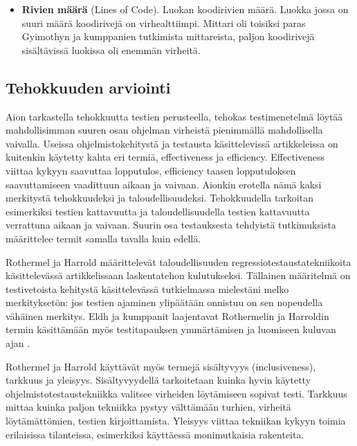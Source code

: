 \documentclass[finnish]{tktltiki2}
\theoremstyle{definition}
\theoremstyle{remark}
\begin{document}
\begin{itemize}
  \item \textbf{Rivien määrä} (Lines of Code). Luokan koodirivien määrä.  Luokka jossa on suuri määrä koodirivejä on virhealttiimpi. Mittari oli toisiksi paras Gyimothyn ja kumppanien tutkimista mittareista, paljon koodirivejä sisältävissä luokissa oli enemmän virheitä. \cite{Gyimothy05}


\end{itemize}





\subsection{Tehokkuuden arviointi}

Aion tarkastella tehokkuutta testien perusteella, tehokas testimenetelmä löytää mahdollisimman suuren osan ohjelman virheistä pienimmällä mahdollisella vaivalla. Useissa ohjelmistokehitystä ja testausta käsittelevissä artikkeleissa on kuitenkin käytetty kahta eri termiä, effectiveness ja efficiency.  Effectiveness viittaa kykyyn saavuttaa lopputulos, efficiency taasen lopputuloksen saavuttamiseen vaadittuun aikaan ja vaivaan. Aionkin erotella nämä kaksi merkitystä tehokkuudeksi ja taloudellisuudeksi. Tehokkuudella tarkoitan esimerkiksi testien kattavuutta ja taloudellisuudella testien kattavuutta verrattuna aikaan ja vaivaan. Suurin osa testauksesta tehdyistä tutkimuksista määrittelee termit samalla tavalla kuin edellä. \cite{Juristo06}

Rothermel ja Harrold määrittelevät taloudellisuuden regressiotestaustatekniikoita käsittelevässä artikkelissaan \cite{Rothermel96} laskentatehon kulutukseksi. Tällainen määritelmä on testivetoista kehitystä käsittelevässä tutkielmassa mielestäni melko merkityksetön: jos testien ajaminen ylipäätään onnistuu on sen nopeudella vähäinen merkitys. Eldh ja kumppanit laajentavat Rothermelin ja Harroldin termin käsittämään myös testitapauksen ymmärtämisen ja luomiseen kuluvan ajan \cite{Eldh06}.

Rothermel ja Harrold käyttävät myös termejä sisältyvyys (inclusiveness), tarkkuus ja yleisyys. Sisältyvyydellä  tarkoitetaan kuinka hyvin käytetty ohjelmistotestaustekniikka valitsee virheiden löytämiseen sopivat testi. Tarkkuus mittaa kuinka paljon tekniikka pystyy välttämään turhien, virheitä löytämättömien, testien kirjoittamista. Yleisyys viittaa tekniikan kykyyn toimia erilaisissa tilanteissa, esimerkiksi käyttäessä monimutkaisia rakenteita.\cite{Rothermel96}
\end{document}
